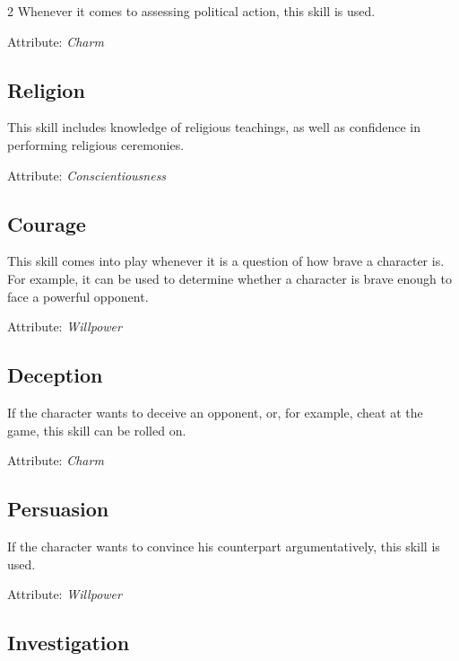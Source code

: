 \begin{multicols}{2}
Whenever it comes to assessing political action, this skill is used.

Attribute: \textit{Charm}

\subsection{Religion}

This skill includes knowledge of religious teachings, as well as confidence in performing religious ceremonies.

Attribute: \textit{Conscientiousness}

\subsection{Courage}

This skill comes into play whenever it is a question of how brave a character is. For example, it can be used to determine whether a character is brave enough to face a powerful opponent.

Attribute: \textit{Willpower}

\subsection{Deception}

If the character wants to deceive an opponent, or, for example, cheat at the game, this skill can be rolled on.

Attribute: \textit{Charm}

\subsection{Persuasion}

If the character wants to convince his counterpart argumentatively, this skill is used.

Attribute: \textit{Willpower}

\subsection{Investigation}


\end{multicols}
